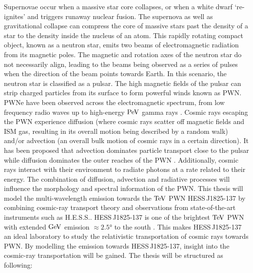 Supernovae occur when a massive star core collapses, or when a white dwarf `re-ignites' and triggers runaway nuclear fusion. The supernova as well as gravitational collapse can compress the core of massive stars past the density of a star to the density inside the nucleus of an atom. This rapidly rotating compact object, known as a neutron star, emits two beams of electromagnetic radiation from its magnetic poles. The magnetic and rotation axes of the neutron star do not necessarily align, leading to the beams being observed as a series of pulses when the direction of the beam points towards Earth. In this scenario, the neutron star is classified as a pulsar. The high magnetic fields of the pulsar can strip charged particles from its surface to form powerful winds known as PWN. PWNe have been observed across the electromagnetic spectrum, from low frequency radio waves \citep{1968Natur.217..709H} up to high-energy $\PeV$ gamma rays \citep{doi:10.1126/science.abg5137}.
\newpar
Cosmic rays escaping the PWN experience diffusion (where cosmic rays scatter off magnetic fields and ISM gas, resulting in its overall motion being described by a random walk) and/or advection (an overall bulk motion of cosmic rays in a certain direction). It has been proposed that advection dominates particle transport close to the pulsar while diffusion dominates the outer reaches of the PWN \citep{2020A&A...636A.113G, 2021PhRvD.104l3017R}. Additionally, cosmic rays interact with their environment to radiate photons at a rate related to their energy. The combination of diffusion, advection and radiative processes will influence the morphology and spectral information of the PWN.
\newpar 
This thesis will model the multi-wavelength emission towards the $\TeV$ PWN \linebreak \mbox{HESS\,J1825-137} by combining cosmic-ray transport theory and observations from state-of-the-art instruments such as H.E.S.S.. \mbox{HESS\,J1825-137} is one of the brightest $\TeV$ PWN with extended $\si{\giga\electronvolt}$ emission $\approx \ang{2.5}$ to the south \citep{2019MNRAS.485.1001A}. This makes \mbox{HESS\,J1825-137} an ideal laboratory to study the relativistic transportation of cosmic rays towards PWN. By modelling the emission towards \mbox{HESS\,J1825-137}, insight into the cosmic-ray transportation will be gained.
\newpar
The thesis will be structured as following:
